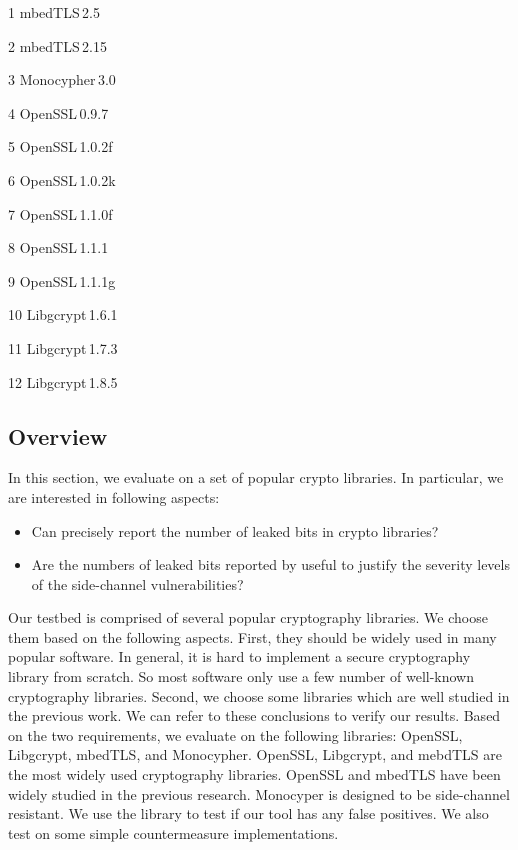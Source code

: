 \begin{table}[]
\begin{tablenotes}
        \item[1] mbedTLS\,2.5  \,~~~~~\item[2] mbedTLS\,2.15 ~\item[3] Monocypher\,3.0 \\
        \item[4] OpenSSL\,0.9.7  ~~~\item[5] OpenSSL\,1.0.2f  \item[6] OpenSSL\,1.0.2k 
        \item[7] OpenSSL\,1.1.0f ~\item[8] OpenSSL\,1.1.1 ~\item[9] OpenSSL\,1.1.1g \\
        \item[10] Libgcrypt\,1.6.1 ~\item[11] Libgcrypt\,1.7.3 \item[12] Libgcrypt\,1.8.5\\
    \end{tablenotes}

\end{table}

\subsection{Overview}
In this section, we evaluate \tool{} on a set of popular crypto libraries.
In particular, we are interested in following aspects:
\begin{itemize}
\item Can \tool{} precisely report the number of leaked bits in crypto
          libraries? 
\item Are the numbers of leaked bits reported by \tool{} useful
          to justify the severity levels of the side-channel vulnerabilities?
\end{itemize}

Our testbed is comprised of several popular cryptography libraries. We choose them based
on the following aspects. First, they should be widely used in many popular software.
In general, it is hard to implement a secure cryptography library from scratch. So most
software only use a few number of well-known cryptography libraries. Second, we choose some
libraries which are well studied in the previous work. We can refer to these conclusions to
verify our results. Based on the two requirements, we evaluate \tool{} on the following libraries:
OpenSSL, Libgcrypt, mbedTLS, and Monocypher. OpenSSL, Libgcrypt, and mebdTLS are the most widely used
cryptography libraries. OpenSSL and mbedTLS have been widely studied in the previous research.
Monocyper is designed to be side-channel resistant. We use the library to test if our tool has any
false positives. We also test \tool{} on some simple countermeasure implementations. 

